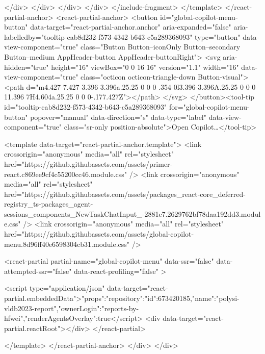 </div>  </div>
</div>  </div>
</include-fragment>
      </template>
    </react-partial-anchor>
    <react-partial-anchor>
      <button id="global-copilot-menu-button" data-target="react-partial-anchor.anchor" aria-expanded="false" aria-labelledby="tooltip-cab8d232-f573-4342-b643-c5a289368093" type="button" data-view-component="true" class="Button Button--iconOnly Button--secondary Button--medium AppHeader-button AppHeader-buttonRight">  <svg aria-hidden="true" height="16" viewBox="0 0 16 16" version="1.1" width="16" data-view-component="true" class="octicon octicon-triangle-down Button-visual">
    <path d="m4.427 7.427 3.396 3.396a.25.25 0 0 0 .354 0l3.396-3.396A.25.25 0 0 0 11.396 7H4.604a.25.25 0 0 0-.177.427Z"></path>
</svg>
</button><tool-tip id="tooltip-cab8d232-f573-4342-b643-c5a289368093" for="global-copilot-menu-button" popover="manual" data-direction="s" data-type="label" data-view-component="true" class="sr-only position-absolute">Open Copilot…</tool-tip>

      <template data-target="react-partial-anchor.template">
        <link crossorigin="anonymous" media="all" rel="stylesheet" href="https://github.githubassets.com/assets/primer-react.c869ee9cf4c55200cc46.module.css" />
<link crossorigin="anonymous" media="all" rel="stylesheet" href="https://github.githubassets.com/assets/packages_react-core_deferred-registry_ts-packages_agent-sessions_components_NewTaskChatInput_-2881e7.2629762bf78daa192dd3.module.css" />
<link crossorigin="anonymous" media="all" rel="stylesheet" href="https://github.githubassets.com/assets/global-copilot-menu.8d96ff40e6598304cb31.module.css" />

<react-partial
  partial-name="global-copilot-menu"
  data-ssr="false"
  data-attempted-ssr="false"
  data-react-profiling="false"
>
  
  <script type="application/json" data-target="react-partial.embeddedData">{"props":{"repository":{"id":673420185,"name":"polysi-vldb2023-report","ownerLogin":"reports-by-hfwei"},"renderAgentsOverlay":true}}</script>
  <div data-target="react-partial.reactRoot"></div>
</react-partial>


      </template>
    </react-partial-anchor>
  </div>
</div>


